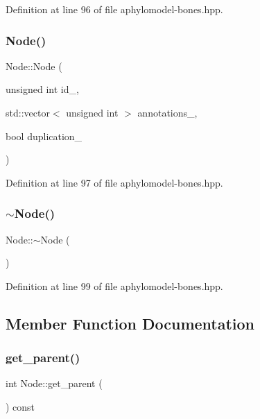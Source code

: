 Definition at line 96 of file aphylomodel-\/bones.\+hpp.

\mbox{\label{class_node_a05edab5d06fba5a71443399343645553}} 
\subsubsection{\texorpdfstring{Node()}{Node()}\hspace{0.1cm}{\footnotesize\ttfamily [3/3]}}
{\footnotesize\ttfamily Node\+::\+Node (\begin{DoxyParamCaption}\item[{unsigned int}]{id\+\_\+,  }\item[{std\+::vector$<$ unsigned int $>$}]{annotations\+\_\+,  }\item[{bool}]{duplication\+\_\+ }\end{DoxyParamCaption})\hspace{0.3cm}{\ttfamily [inline]}}



Definition at line 97 of file aphylomodel-\/bones.\+hpp.

\mbox{\label{class_node_aa0840c3cb5c7159be6d992adecd2097c}} 
\subsubsection{\texorpdfstring{$\sim$\+Node()}{~Node()}}
{\footnotesize\ttfamily Node\+::$\sim$\+Node (\begin{DoxyParamCaption}{ }\end{DoxyParamCaption})\hspace{0.3cm}{\ttfamily [inline]}}



Definition at line 99 of file aphylomodel-\/bones.\+hpp.



\subsection{Member Function Documentation}
\mbox{\label{class_node_a661cb63a33e950b84c9c093c63d1ab63}} 
\subsubsection{\texorpdfstring{get\+\_\+parent()}{get\_parent()}}
{\footnotesize\ttfamily int Node\+::get\+\_\+parent (\begin{DoxyParamCaption}{ }\end{DoxyParamCaption}) const\hspace{0.3cm}{\ttfamily [inline]}}



